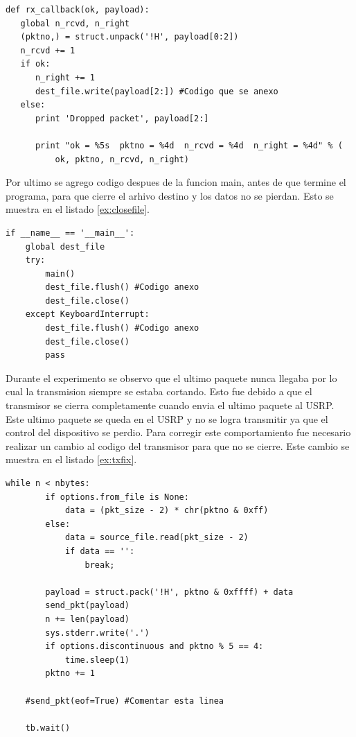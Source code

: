 \begin{lstlisting}[float, label=ex:rxcallback, caption={Funcion que recive los datos demodulados y
los escribe a un archivo.}, breaklines=true]
def rx_callback(ok, payload):
   global n_rcvd, n_right
   (pktno,) = struct.unpack('!H', payload[0:2])
   n_rcvd += 1
   if ok:
      n_right += 1
      dest_file.write(payload[2:]) #Codigo que se anexo
   else:
      print 'Dropped packet', payload[2:]

      print "ok = %5s  pktno = %4d  n_rcvd = %4d  n_right = %4d" % (
          ok, pktno, n_rcvd, n_right)

\end{lstlisting}

Por ultimo se agrego codigo despues de la funcion main, antes de que termine el programa, para que
cierre el arhivo destino y los datos no se pierdan. Esto se muestra en el listado
\ref{ex:closefile}.

\begin{lstlisting}[float, label=ex:closefile, caption={C\'odigo anexo al final del programa
benchmark para cerrar el archivo destino.}, breaklines=true]
if __name__ == '__main__':
    global dest_file
    try:
        main()
        dest_file.flush() #Codigo anexo
        dest_file.close()
    except KeyboardInterrupt:
        dest_file.flush() #Codigo anexo
        dest_file.close()
        pass

\end{lstlisting}

Durante el experimento se observo que el ultimo paquete nunca llegaba por lo cual la transmision
siempre se estaba cortando. Esto fue debido a que el transmisor se cierra completamente cuando envia
el ultimo paquete al USRP. Este ultimo paquete se queda en el USRP y no se logra transmitir ya que
el control del dispositivo se perdio. Para corregir este comportamiento fue necesario realizar un
cambio al codigo del transmisor para que no se cierre. Este cambio se muestra en el listado
\ref{ex:txfix}.

\begin{lstlisting}[float, label=ex:txfix, caption={Correccion al codigo TX para poder enviar el
ultimo paquete.}, breaklines=true]
    while n < nbytes:
        if options.from_file is None:
            data = (pkt_size - 2) * chr(pktno & 0xff) 
        else:
            data = source_file.read(pkt_size - 2)
            if data == '':
                break;

        payload = struct.pack('!H', pktno & 0xffff) + data
        send_pkt(payload)
        n += len(payload)
        sys.stderr.write('.')
        if options.discontinuous and pktno % 5 == 4:
            time.sleep(1)
        pktno += 1
        
    #send_pkt(eof=True) #Comentar esta linea

    tb.wait()                 
\end{lstlisting}

